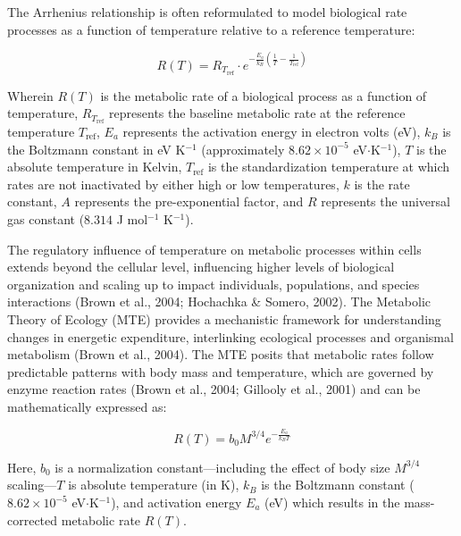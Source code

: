 \documentclass{CSUNthesis}
\begin{document}
The Arrhenius relationship is often reformulated to model biological rate processes as a function of temperature relative to a reference temperature:

\begin{equation}
\label{eq:arrhenius}
R(T) = R_{T_{\text{ref}}} \cdot e^{-\frac{E_a}{k_B} \left( \frac{1}{T} - \frac{1}{T_{\text{ref}}} \right)}
\end{equation}

Wherein \(R(T)\) is the metabolic rate of a biological process as a function of temperature, \(R_{T_{\text{ref}}}\) represents the baseline metabolic rate at the reference temperature \(T_{\text{ref}}\), \(E_a\) represents the activation energy in electron volts (eV), \(k_B\) is the Boltzmann constant in eV K\(^{-1}\) (approximately \(8.62 \times 10^{-5}\) eV\(\cdot\)K\(^{-1}\)), \(T\) is the absolute temperature in Kelvin, \(T_{\text{ref}}\) is the standardization temperature at which rates are not inactivated by either high or low temperatures, \(k\) is the rate constant, \(A\) represents the pre-exponential factor, and \(R\) represents the universal gas constant (\(8.314\) J mol\(^{-1}\) K\(^{-1}\)).

The regulatory influence of temperature on metabolic processes within cells extends beyond the cellular level, influencing higher levels of biological organization and scaling up to impact individuals, populations, and species interactions (Brown et al., 2004; Hochachka \& Somero, 2002). The Metabolic Theory of Ecology (MTE) provides a mechanistic framework for understanding changes in energetic expenditure, interlinking ecological processes and organismal metabolism (Brown et al., 2004). The MTE posits that metabolic rates follow predictable patterns with body mass and temperature, which are governed by enzyme reaction rates (Brown et al., 2004; Gillooly et al., 2001) and can be mathematically expressed as:

\begin{equation}
\label{eq:MTE}
R(T) = b_0 M^{3/4} e^{-\frac{E_a}{k_B T}}
\end{equation}

Here, \(b_0\) is a normalization constant---including the effect of body size \(M^{3/4}\) scaling---\(T\) is absolute temperature (in K), \(k_B\) is the Boltzmann constant (\(8.62 \times 10^{-5}\) eV\(\cdot\)K\(^{-1}\)), and activation energy \(E_a\) (eV) which results in the mass-corrected metabolic rate \(R(T)\).
\end{document}
